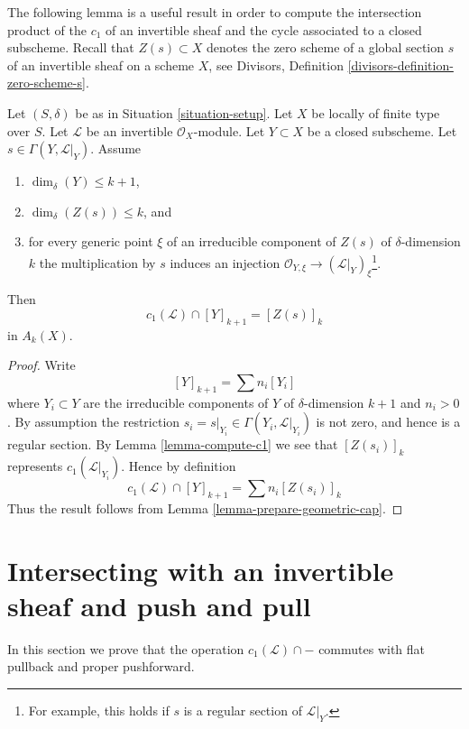 \noindent
The following lemma is a useful result in order to compute the intersection
product of the $c_1$ of an invertible sheaf and the cycle associated
to a closed subscheme.
Recall that $Z(s) \subset X$ denotes the zero scheme of a global section
$s$ of an invertible sheaf on a scheme $X$, see
Divisors, Definition \ref{divisors-definition-zero-scheme-s}.

\begin{lemma}
\label{lemma-geometric-cap}
Let $(S, \delta)$ be as in Situation \ref{situation-setup}.
Let $X$ be locally of finite type over $S$.
Let $\mathcal{L}$ be an invertible $\mathcal{O}_X$-module.
Let $Y \subset X$ be a closed subscheme.
Let $s \in \Gamma(Y, \mathcal{L}|_Y)$.
Assume
\begin{enumerate}
\item $\dim_\delta(Y) \leq k + 1$,
\item $\dim_\delta(Z(s)) \leq k$, and
\item for every generic point $\xi$ of an irreducible component of
$Z(s)$ of $\delta$-dimension $k$ the multiplication by $s$
induces an injection
$\mathcal{O}_{Y, \xi} \to (\mathcal{L}|_Y)_\xi$\footnote{For example,
this holds if $s$ is a regular section of $\mathcal{L}|_Y$.}.
\end{enumerate}
Then
$$
c_1(\mathcal{L}) \cap [Y]_{k + 1} = [Z(s)]_k
$$
in $A_k(X)$.
\end{lemma}

\begin{proof}
Write
$$
[Y]_{k + 1} = \sum n_i[Y_i]
$$
where $Y_i \subset Y$ are the irreducible components of
$Y$ of $\delta$-dimension $k + 1$ and $n_i > 0$.
By assumption the restriction
$s_i = s|_{Y_i} \in \Gamma(Y_i, \mathcal{L}|_{Y_i})$ is not
zero, and hence is a regular section. By Lemma \ref{lemma-compute-c1}
we see that $[Z(s_i)]_k$ represents $c_1(\mathcal{L}|_{Y_i})$.
Hence by definition
$$
c_1(\mathcal{L}) \cap [Y]_{k + 1} = \sum n_i[Z(s_i)]_k
$$
Thus the result follows from Lemma \ref{lemma-prepare-geometric-cap}.
\end{proof}




\section{Intersecting with an invertible sheaf and push and pull}
\label{section-intersecting-with-divisors-push-pull}

\noindent
In this section we prove that the operation $c_1(\mathcal{L}) \cap -$
commutes with flat pullback and proper pushforward.

